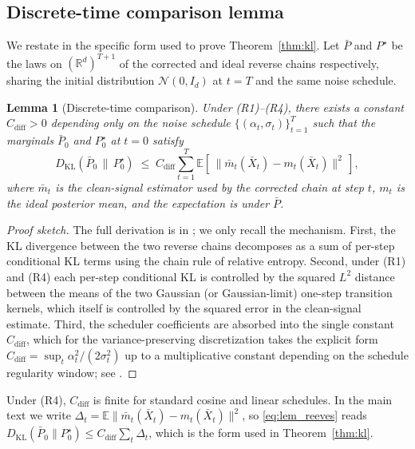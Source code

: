 \documentclass{article}
\theoremstyle{plain}
\newtheorem{lemma}[theorem]{Lemma}
\theoremstyle{definition}
\theoremstyle{remark}
\begin{document}
\subsection{Discrete-time comparison lemma}
\label{app:reeves}

We restate \citet[Theorem~2]{reeves2025itproofs} in the specific form used
to prove Theorem~\ref{thm:kl}. Let \(\bar P\) and \(P^\star\) be the laws on
\((\mathbb{R}^d)^{T+1}\) of the corrected and ideal reverse chains
respectively, sharing the initial distribution \(\mathcal{N}(0,I_d)\) at
\(t=T\) and the same noise schedule.

\begin{lemma}[Discrete-time comparison]\label{lem:reeves}
Under (R1)--(R4), there exists a constant \(C_{\mathrm{diff}}>0\) depending
only on the noise schedule \(\{(\alpha_t,\sigma_t)\}_{t=1}^T\) such that the
marginals \(\bar P_0\) and \(P_0^\star\) at \(t=0\) satisfy
\begin{equation}
D_{\mathrm{KL}}\!\left(\bar P_0 \,\|\, P_0^\star\right)
\;\le\;
C_{\mathrm{diff}} \sum_{t=1}^T
\mathbb{E}\!\left[\,\|\bar m_t(\bar X_t) - m_t(\bar X_t)\|^2\,\right],
\label{eq:lem_reeves}
\end{equation}
where \(\bar m_t\) is the clean-signal estimator used by the corrected
chain at step \(t\), \(m_t\) is the ideal posterior mean, and the
expectation is under \(\bar P\).
\end{lemma}

\begin{proof}[Proof sketch]
The full derivation is in \citet{reeves2025itproofs}; we only recall the
mechanism. First, the KL divergence between the two reverse chains decomposes
as a sum of per-step conditional KL terms using the chain rule of relative
entropy. Second, under (R1) and (R4) each per-step conditional KL is
controlled by the squared \(L^2\) distance between the means of the two
Gaussian (or Gaussian-limit) one-step transition kernels, which itself is
controlled by the squared error in the clean-signal estimate. Third, the
scheduler coefficients are absorbed into the single constant
\(C_{\mathrm{diff}}\), which for the variance-preserving discretization
takes the explicit form
\(C_{\mathrm{diff}} = \sup_{t}\alpha_t^2/(2\sigma_t^2)\) up to a
multiplicative constant depending on the schedule regularity window; see
\citet[eq.~(14)]{reeves2025itproofs}.
\end{proof}

Under (R4), \(C_{\mathrm{diff}}\) is finite for standard cosine and linear
schedules. In the main text we write
\(\Delta_t = \mathbb{E}\|\bar m_t(\bar X_t) - m_t(\bar X_t)\|^2\), so
\eqref{eq:lem_reeves} reads
\(D_{\mathrm{KL}}(\bar P_0 \| P_0^\star) \le C_{\mathrm{diff}}\sum_t \Delta_t\),
which is the form used in Theorem~\ref{thm:kl}.
\end{document}
